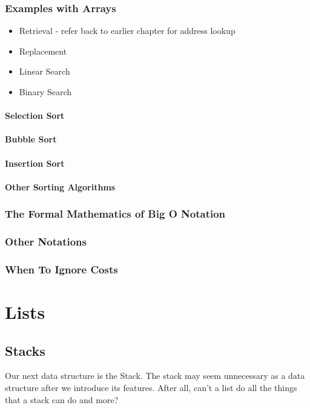 \documentclass[10pt,a4paper]{book}
\begin{document}
\section{Examples with Arrays}

\begin{itemize}
	
	\item Retrieval  - refer back to earlier chapter for address lookup 
	\item Replacement
	\item Linear Search
	\item Binary Search
\end{itemize}



\subsection{Selection Sort}



\subsection{Bubble Sort}
\subsection{Insertion Sort}
\subsection{Other Sorting Algorithms}


\section{The Formal Mathematics of Big O Notation}
\section{Other Notations}


\section{When To Ignore Costs}


\part{Lists}
\label{part-list}


\chapter{Stacks}
Our next data structure is the Stack.
The stack may seem unnecessary as a data structure after we introduce its features.  
After all, can't a list do all the things that a stack can do and more? 
\end{document}
